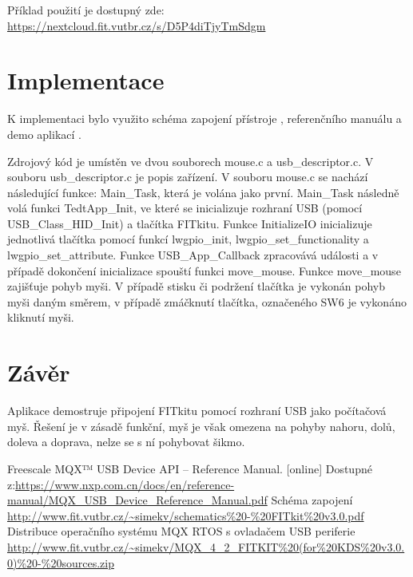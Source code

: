 \documentclass{article}
\begin{document}
Příklad použití je dostupný zde: \url{https://nextcloud.fit.vutbr.cz/s/D5P4diTjyTmSdgm}

\section{Implementace}
K implementaci bylo využito schéma zapojení přístroje \cite{FITkit}, referenčního manuálu\cite{USB} a demo aplikací \cite{demo}.

Zdrojový kód je umístěn ve dvou souborech mouse.c a usb\_descriptor.c. V souboru usb\_descriptor.c je popis zařízení. V souboru mouse.c se nachází následující funkce: Main\_Task, která je volána jako první. Main\_Task následně volá funkci TedtApp\_Init, ve které se inicializuje rozhraní USB (pomocí USB\_Class\_HID\_Init) a tlačítka FITkitu. Funkce InitializeIO inicializuje jednotlivá tlačítka pomocí funkcí lwgpio\_init, lwgpio\_set\_functionality a lwgpio\_set\_attribute. Funkce USB\_App\_Callback zpracovává události a v případě dokončení inicializace spouští funkci move\_mouse. Funkce move\_mouse zajišťuje pohyb myši. V případě stisku či podržení tlačítka je vykonán pohyb myši daným směrem, v případě zmáčknutí tlačítka, označeného SW6 je vykonáno kliknutí myši.


\section{Závěr}
Aplikace demostruje připojení FITkitu pomocí rozhraní USB jako počítačová myš. Řešení je v zásadě funkční, myš je však omezena na pohyby nahoru, dolů, doleva a doprava, nelze se s ní pohybovat šikmo. 

\newpage
\begin{thebibliography}{99}
 Freescale MQX™ USB Device API – Reference Manual. [online] Dostupné z:\url{https://www.nxp.com.cn/docs/en/reference-manual/MQX\_USB\_Device\_Reference\_Manual.pdf}
 Schéma zapojení \url{http://www.fit.vutbr.cz/~simekv/schematics%20-%20FITkit%20v3.0.pdf}
 Distribuce operačního systému MQX RTOS s ovladačem USB periferie \url{http://www.fit.vutbr.cz/~simekv/MQX_4_2_FITKIT%20(for%20KDS%20v3.0.0)%20-%20sources.zip}
\end{thebibliography}
\end{document}
